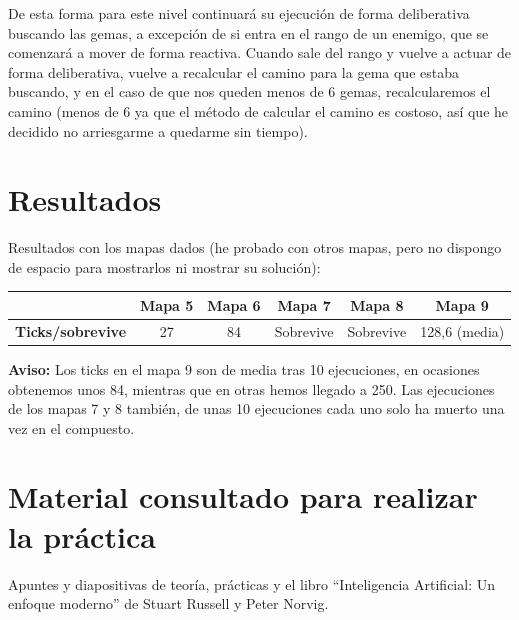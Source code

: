 \documentclass[10pt, spanish]{article}
\begin{document}
De esta forma para este nivel continuará su ejecución de forma deliberativa buscando las gemas, a excepción de si entra en el rango de un enemigo, que se comenzará a mover de forma reactiva. Cuando sale del rango y vuelve a actuar de forma deliberativa, vuelve a recalcular el camino para la gema que estaba buscando, y en el caso de que nos queden menos de 6 gemas, recalcularemos el camino (menos de 6 ya que el método de calcular el camino es costoso, así que he decidido no arriesgarme a quedarme sin tiempo).

\section{Resultados}

Resultados con los mapas dados (he probado con otros mapas, pero no dispongo de espacio para mostrarlos ni mostrar su solución):

\begin{table}[H]
\centering
\begin{tabular}{|c|c|c|c|c|c|}
\hline
                         & \textbf{Mapa 5} & \textbf{Mapa 6} & \textbf{Mapa 7} & \textbf{Mapa 8} & \textbf{Mapa 9} \\ \hline
\textbf{Ticks/sobrevive} & 27              & 84              & Sobrevive       & Sobrevive       & 128,6 (media)            \\ \hline
\end{tabular}
\end{table}

\textbf{Aviso:} Los ticks en el mapa 9 son de media tras 10 ejecuciones, en ocasiones obtenemos unos 84, mientras que en otras hemos llegado a 250. Las ejecuciones de los mapas 7 y 8 también, de unas 10 ejecuciones cada uno solo ha muerto una vez en el compuesto.

\section{Material consultado para realizar la práctica}

Apuntes y diapositivas de teoría, prácticas y el libro ``Inteligencia Artificial: Un enfoque moderno'' de Stuart Russell y Peter Norvig.
\end{document}
